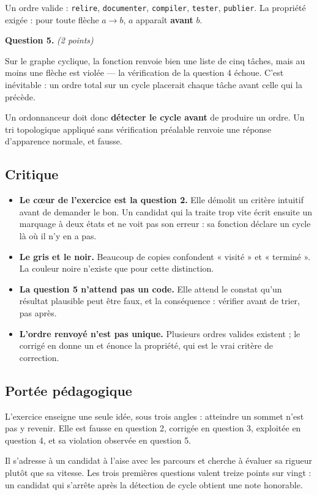 Un ordre valide : \lstinline{relire}, \lstinline{documenter},
\lstinline{compiler}, \lstinline{tester}, \lstinline{publier}. La propriété
exigée : pour toute flèche $a \rightarrow b$, $a$ apparaît \textbf{avant} $b$.

\medskip
\textbf{Question 5.} \emph{(2 points)}

Sur le graphe cyclique, la fonction renvoie bien une liste de cinq tâches, mais
au moins une flèche est violée — la vérification de la question 4 échoue. C'est
inévitable : un ordre total sur un cycle placerait chaque tâche avant celle qui
la précède.

Un ordonnanceur doit donc \textbf{détecter le cycle avant} de produire un
ordre. Un tri topologique appliqué sans vérification préalable renvoie une
réponse d'apparence normale, et fausse.

\subsection*{Critique}

\begin{itemize}
  \item \textbf{Le cœur de l'exercice est la question 2.} Elle démolit un
    critère intuitif avant de demander le bon. Un candidat qui la traite trop
    vite écrit ensuite un marquage à deux états et ne voit pas son erreur : sa
    fonction déclare un cycle là où il n'y en a pas.
  \item \textbf{Le gris et le noir.} Beaucoup de copies confondent « visité » et
    « terminé ». La couleur noire n'existe que pour cette distinction.
  \item \textbf{La question 5 n'attend pas un code.} Elle attend le constat
    qu'un résultat plausible peut être faux, et la conséquence : vérifier avant
    de trier, pas après.
  \item \textbf{L'ordre renvoyé n'est pas unique.} Plusieurs ordres valides
    existent ; le corrigé en donne un et énonce la propriété, qui est le vrai
    critère de correction.
\end{itemize}

\subsection*{Portée pédagogique}

L'exercice enseigne une seule idée, sous trois angles : atteindre un sommet
n'est pas y revenir. Elle est fausse en question 2, corrigée en question 3,
exploitée en question 4, et sa violation observée en question 5.

Il s'adresse à un candidat à l'aise avec les parcours et cherche à évaluer sa
rigueur plutôt que sa vitesse. Les trois premières questions valent treize
points sur vingt : un candidat qui s'arrête après la détection de cycle obtient
une note honorable.
